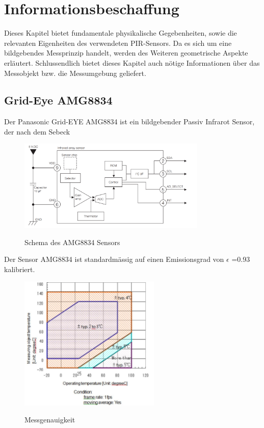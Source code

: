 \chapter{Informationsbeschaffung}
\label{chap:Informationsbeschaffung}
Dieses Kapitel bietet fundamentale physikalische Gegebenheiten, sowie die relevanten Eigenheiten des verwendeten  \ac{PIR}-Sensors. Da es sich um eine bildgebendes Messprinzip handelt, werden des Weiteren geometrische Aspekte erläutert. Schlussendlich bietet dieses Kapitel auch nötige Informationen über das Messobjekt bzw. die Messumgebung geliefert.




\section{Grid-Eye AMG8834}

Der Panasonic Grid-EYE AMG8834 ist ein bildgebender Passiv Infrarot Sensor, der nach dem Sebeck 

\begin{figure}[H]
	\centering
	\includegraphics[width=0.8\textwidth]
	{fig/Circuit_AMG8834.PNG}
	\caption[Schema des AMG8834 Sensors]{Schema des AMG8834 Sensors} \protect\cite{AMG8834}
	\label{fig:SchemaAMG8834}
\end{figure}

Der Sensor AMG8834 ist standardmässig auf einen Emissionsgrad von $\epsilon$ =0.93 kalibriert.

\begin{figure}[H]
	\centering
	\includegraphics[width=0.6\textwidth]
	{fig/accuracy.PNG}
	\caption[Messgenauigkeit]{Messgenauigkeit} \protect\cite{AMG8834}
	\label{fig:Temperaturbereich}
\end{figure}

